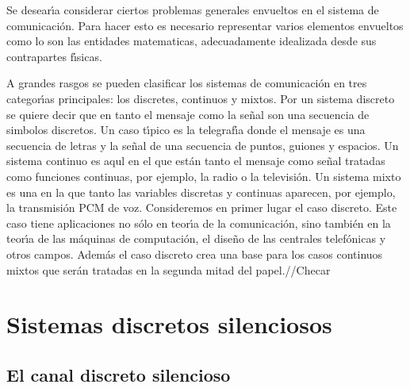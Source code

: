 Se desear\'{\i}a considerar ciertos problemas generales envueltos en
 el sistema de comunicaci\'{o}n. Para hacer esto es necesario
 representar varios elementos envueltos como lo son las entidades
 matematicas, adecuadamente idealizada desde sus contrapartes
 f\'{\i}sicas.


A grandes rasgos se pueden clasificar los sistemas de comunicaci\'{o}n
en tres categor\'{\i}as principales: los discretes, continuos y
mixtos. Por un sistema discreto se quiere decir que en tanto el
mensaje como la se\~{n}al son una secuencia de simbolos discretos. Un
caso t\'{\i}pico es la telegraf\'{\i}a donde el mensaje es una
secuencia de letras y la se\~{n}al de una secuencia de puntos, guiones
y espacios. Un sistema continuo es aqul en el que est\'{a}n tanto el
mensaje como se\~{n}al tratadas como funciones continuas, por ejemplo,
la radio o la televisi\'{o}n. Un sistema mixto es una en la que tanto
las variables discretas y continuas aparecen, por ejemplo, la
transmisi\'{o}n PCM de voz. Consideremos en primer lugar el caso
discreto. Este caso tiene aplicaciones no s\'{o}lo en teor\'{\i}a de
la comunicaci\'{o}n, sino tambi\'{e}n en la teor\'{\i}a de las
m\'{a}quinas de computaci\'{o}n, el dise\~{n}o de las centrales
telef\'{o}nicas y otros campos.  Adem\'{a}s el caso discreto crea una
base para los casos continuos mixtos que ser\'{a}n tratadas en la
segunda mitad del papel.//Checar

\clearpage

\chapter{Sistemas discretos silenciosos}

\section{El canal discreto silencioso}

